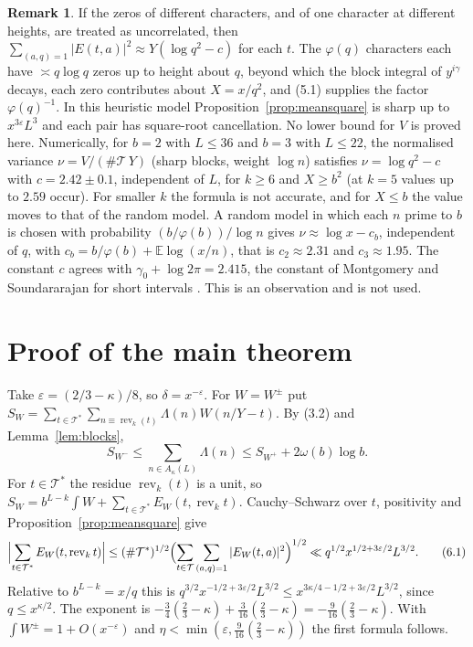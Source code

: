 \documentclass[11pt]{amsart}
\theoremstyle{definition}
\newtheorem{remark}[theorem]{Remark}
\numberwithin{equation}{section}
\newcommand{\rev}{\operatorname{rev}}
\newcommand{\cT}{\mathcal{T}}
\begin{document}
\begin{remark}\label{rem:size}
If the zeros of different characters, and of one character at different heights, are treated as uncorrelated, then $\sum_{(a,q)=1}|E(t,a)|^2\approx Y(\log q^2-c)$ for each $t$. The $\varphi(q)$ characters each have $\asymp q\log q$ zeros up to height about $q$, beyond which the block integral of $y^{i\gamma}$ decays, each zero contributes about $X=x/q^2$, and (5.1) supplies the factor $\varphi(q)^{-1}$. In this heuristic model Proposition~\ref{prop:meansquare} is sharp up to $x^{3\varepsilon}L^3$ and each pair has square-root cancellation. No lower bound for $V$ is proved here. Numerically, for $b=2$ with $L\le36$ and $b=3$ with $L\le22$, the normalised variance $\nu=V/(\#\cT\,Y)$ (sharp blocks, weight $\log n$) satisfies $\nu=\log q^2-c$ with $c=2.42\pm0.1$, independent of $L$, for $k\ge6$ and $X\ge b^2$ (at $k=5$ values up to $2.59$ occur). For smaller $k$ the formula is not accurate, and for $X\le b$ the value moves to that of the random model. A random model in which each $n$ prime to $b$ is chosen with probability $(b/\varphi(b))/\log n$ gives $\nu\approx\log x-c_b$, independent of $q$, with $c_b=b/\varphi(b)+\mathbb E\log(x/n)$, that is $c_2\approx2.31$ and $c_3\approx1.95$. The constant $c$ agrees with $\gamma_0+\log2\pi=2.415$, the constant of Montgomery and Soundararajan for short intervals \cite{MS}. This is an observation and is not used.
\end{remark}

\section{Proof of the main theorem}\label{sec:main}

Take $\varepsilon=(2/3-\kappa)/8$, so $\delta=x^{-\varepsilon}$. For $W=W^\pm$ put $S_W=\sum_{t\in\cT^*}\sum_{n\equiv\rev_k(t)}\Lambda(n)W(n/Y-t)$. By (3.2) and Lemma~\ref{lem:blocks},
\[
S_{W^-}\le\sum_{n\in A_\kappa(L)}\Lambda(n)\le S_{W^+}+2\omega(b)\log b.
\]
For $t\in\cT^*$ the residue $\rev_k(t)$ is a unit, so $S_W=b^{L-k}\int W+\sum_{t\in\cT^*}E_W(t,\rev_kt)$. Cauchy--Schwarz over $t$, positivity and Proposition~\ref{prop:meansquare} give
\[
\Bigl|\sum_{t\in\cT^*}E_W(t,\rev_kt)\Bigr|\le(\#\cT^*)^{1/2}\Bigl(\sum_{t\in\cT}\sum_{(a,q)=1}|E_W(t,a)|^2\Bigr)^{1/2}\ll q^{1/2}x^{1/2+3\varepsilon/2}L^{3/2}.
\tag{6.1}
\]
Relative to $b^{L-k}=x/q$ this is $q^{3/2}x^{-1/2+3\varepsilon/2}L^{3/2}\le x^{3\kappa/4-1/2+3\varepsilon/2}L^{3/2}$, since $q\le x^{\kappa/2}$. The exponent is $-\frac34(\frac23-\kappa)+\frac3{16}(\frac23-\kappa)=-\frac9{16}(\frac23-\kappa)$. With $\int W^\pm=1+O(x^{-\varepsilon})$ and $\eta<\min(\varepsilon,\frac9{16}(\frac23-\kappa))$ the first formula follows.
\end{document}
